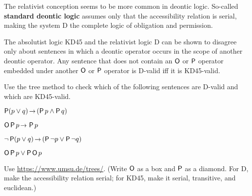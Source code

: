 The relativist conception seems to be more common in deontic logic. So-called
\textbf{standard deontic logic} assumes only that the accessibility relation is
serial, making the system D the complete logic of obligation and permission.

The absolutist logic KD45 and the relativist logic D can be shown to disagree
only about sentences in which a deontic operator occurs in the scope of another
deontic operator. Any sentence that does not contain an $\operatorname{\mathsf{O}}$ or $\operatorname{\mathsf{P}}$ operator
embedded under another $\operatorname{\mathsf{O}}$ or $\operatorname{\mathsf{P}}$ operator is D-valid iff it is KD45-valid.


\begin{exercise}
  Use the tree method to check which of the following sentences are D-valid and
  which are KD45-valid.
  \begin{exlist}
    \item $\Pe (p \lor q) \to (\Pe p \land \Pe q)$
    \item $\Ob\Pe p \to \Pe p$
    \item $\neg\Pe(p \lor q) \to (\Pe \neg p \lor \Pe\neg q)$
    \item $\operatorname{\mathsf{O}}\operatorname{\mathsf{P}} p \lor \operatorname{\mathsf{P}}\operatorname{\mathsf{O}} p$
  \end{exlist}
\end{exercise}
\begin{solution}
  Use
  \href{https://www.umsu.de/trees/}{https://www.umsu.de/trees/}.
  (Write $\operatorname{\mathsf{O}}$ as a box and $\operatorname{\mathsf{P}}$ as a diamond. For D, make the accessibility
  relation serial; for KD45, make it serial, transitive, and euclidean.)
\end{solution}

